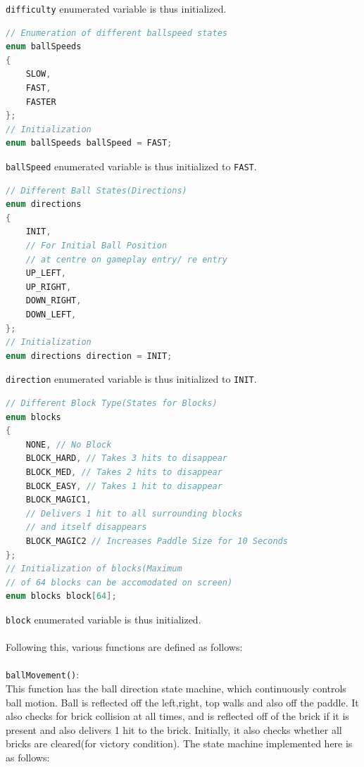 \documentclass{article}
\begin{document}
    \texttt{difficulty} enumerated variable is thus initialized.
\begin{lstlisting}[basicstyle = \small, language = C]
// Enumeration of different ballspeed states
enum ballSpeeds
{
    SLOW,
    FAST,
    FASTER
};
// Initialization
enum ballSpeeds ballSpeed = FAST;
  \end{lstlisting}
\texttt{ballSpeed} enumerated variable is thus initialized to \texttt{FAST}.
\begin{lstlisting}[basicstyle = \small, language = C]
// Different Ball States(Directions)
enum directions
{
    INIT, 
    // For Initial Ball Position 
    // at centre on gameplay entry/ re entry
    UP_LEFT,
    UP_RIGHT,
    DOWN_RIGHT,
    DOWN_LEFT,
};
// Initialization
enum directions direction = INIT;
  \end{lstlisting}
\texttt{direction} enumerated variable is thus initialized to \texttt{INIT}.
\begin{lstlisting}[basicstyle = \small, language = C]
// Different Block Type(States for Blocks)
enum blocks
{
    NONE, // No Block
    BLOCK_HARD, // Takes 3 hits to disappear
    BLOCK_MED, // Takes 2 hits to disappear
    BLOCK_EASY, // Takes 1 hit to disappear
    BLOCK_MAGIC1, 
    // Delivers 1 hit to all surrounding blocks 
    // and itself disappears
    BLOCK_MAGIC2 // Increases Paddle Size for 10 Seconds
};
// Initialization of blocks(Maximum 
// of 64 blocks can be accomodated on screen)
enum blocks block[64];
  \end{lstlisting}
    \texttt{block} enumerated variable is thus initialized. \\ \\
\qquad Following this, various functions are defined as follows: \\ \\
\texttt{ballMovement()}:\\ This function has the ball direction state machine, which continuously controls ball motion. Ball is reflected off the left,right, top walls and also off the paddle. It also checks for brick collision at all times, and is reflected off of the brick if it is present and also delivers 1 hit to the brick. Initially, it also checks whether all bricks are cleared(for victory condition).
The state machine implemented here is as follows:
\end{document}
